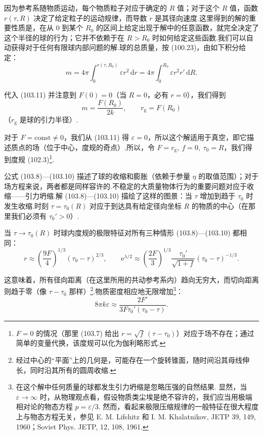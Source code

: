 因为参考系随物质运动，每个物质粒子对应于确定的 $R$ 值；对于这个 $R$ 值，函数 $r(\tau,R)$ 决定了给定粒子的运动规律，而导数 $\dot{r}$ 是其径向速度.这里得到的解的重要性质是，在从 0 到某个 $R_0$ 的区间上给定出现于解中的任意函数，就完全决定了这个半径的球的行为；它并不依赖于在 $R>R_0$ 时如何给定这些函数.我们可以自动获得对于任何有限球内部问题的解.球的总质量，按 (100.23)，由如下积分给定：
\begin{equation*}
  m=4\pi\int_{0}^{r(\tau,R_0)}\varepsilon r^{2}\,\mathrm{d}r
  =4\pi\int_{0}^{R_0}\varepsilon r^{2}r'\,\mathrm{d}R.
\end{equation*}

代入 (103.11) 并注意到 $F(0)=0$（当 $R=0$，必有 $r=0$），我们得到
\begin{equation}
  m=\frac{F(R_0)}{2k},\qquad r_{\mathrm{g}}=F(R_0)
\end{equation}
（$r_{\mathrm{g}}$ 是球的引力半径）.

对于 $F=\mathrm{const}\neq0$，我们从 (103.11) 得 $\varepsilon=0$，所以这个解适用于真空，即它描述质点的场（位于中心，度规的奇点）.所以，令 $F=r_{\mathrm{g}},\ f=0,\ \tau_0=R$，我们得到度规 (102.3)\footnote{$F=0$ 的情况（那里 (103.7) 给出 $r=\sqrt{f}\,(\tau-\tau_{0})$）对应于场不存在；通过简单的变量代换，该度规可以化为伽利略形式.}.

公式 (103.8)—(103.10) 描述了球的收缩和膨胀（依赖于参量 $\eta$ 的取值范围）；对于场方程来说，两者都是同样容许的.不稳定的大质量物体行为的重要问题对应于收缩——引力坍缩.解 (103.8)—(103.10) 描绘了这样的图景：当 $\tau$ 增加到趋于 $\tau_0$ 时发生收缩.时刻 $\tau=\tau_0(R)$ 对应于到达具有给定径向坐标 $R$ 的物质的中心（在那里我们必须有 $\tau_0'>0$）.

当 $\tau\to\tau_0(R)$ 时球内度规的极限特征对所有三种情形 (103.8)—(103.10) 都相同：
\begin{equation}
  r\approx\left(\frac{9F}{4}\right)^{1/3}(\tau_0-\tau)^{2/3},
  \qquad
  \mathrm{e}^{\lambda/2}\approx\left(\frac{2F}{3}\right)^{1/3}
  \frac{\tau_0'}{\sqrt{1+f}}(\tau_0-\tau)^{-1/3}.
\end{equation}

这意味着，所有径向距离（在这里所用的共动参考系内）趋向无穷大，而切向距离则趋于零（像 $\tau-\tau_0$ 那样）\footnote{经过中心的“平面”上的几何是，可能存在一个旋转锥面，随时间沿其母线伸长，同时沿其所有的圆周收缩.}.物质密度相应地无限增加\footnote{在这个解中任何质量的球都发生引力坍缩是忽略压强的自然结果. 显然，当 $\varepsilon\to\infty$ 时，从物理观点看，假设物质类尘埃是绝不容许的，我们应当用极端相对论的物态方程 $p=\varepsilon/3$. 然而，看起来极限压缩规律的一般特征在很大程度上与物态方程无关，参见 E. M. Lifshitz 和 I. M. Khalatnikov, JETP 39, 149, 1960；Soviet Phys. JETP, 12, 108, 1961.}：
\begin{equation}
  8\pi k\varepsilon\approx
  \frac{2F'}{3F\tau_0'(\tau_0-\tau)}.
\end{equation}


